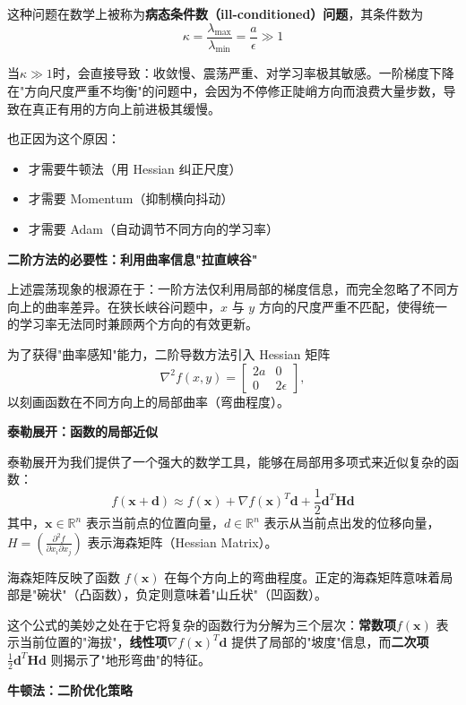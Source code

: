 这种问题在数学上被称为\textbf{病态条件数（ill-conditioned）问题}，其条件数为
$$\kappa = \frac{\lambda_{\max}}{\lambda_{\min}} = \frac{a}{\epsilon} \gg 1$$

当$\kappa \gg 1$时，会直接导致：收敛慢、震荡严重、对学习率极其敏感。一阶梯度下降在"方向尺度严重不均衡"的问题中，会因为不停修正陡峭方向而浪费大量步数，导致在真正有用的方向上前进极其缓慢。

也正因为这个原因：
\begin{itemize}
    \item 才需要牛顿法（用 Hessian 纠正尺度）
    \item 才需要 Momentum（抑制横向抖动）
    \item 才需要 Adam（自动调节不同方向的学习率）
\end{itemize}

\textbf{二阶方法的必要性：利用曲率信息"拉直峡谷"}

上述震荡现象的根源在于：一阶方法仅利用局部的梯度信息，而完全忽略了不同方向上的曲率差异。在狭长峡谷问题中，$x$ 与 $y$ 方向的尺度严重不匹配，使得统一的学习率无法同时兼顾两个方向的有效更新。

为了获得"曲率感知"能力，二阶导数方法引入 Hessian 矩阵
\[
\nabla^2 f(x,y) =
\begin{bmatrix}
2a & 0 \\
0 & 2\epsilon
\end{bmatrix},
\]
以刻画函数在不同方向上的局部曲率（弯曲程度）。

\textbf{泰勒展开：函数的局部近似}

泰勒展开为我们提供了一个强大的数学工具，能够在局部用多项式来近似复杂的函数：
$$
f(\mathbf{x}+\mathbf{d}) \approx f(\mathbf{x}) + \nabla f(\mathbf{x})^T\mathbf{d}
+ \frac{1}{2}\mathbf{d}^T\mathbf{H}\mathbf{d}
$$
其中，$\mathbf{x}\in \mathbb{R}^n$ 表示当前点的位置向量，$d\in \mathbb{R}^n$ 表示从当前点出发的位移向量，$H = \left(\frac{\partial^2 f}{\partial x_i \partial x_j} \right)$ 表示海森矩阵（Hessian Matrix）。

海森矩阵反映了函数 $f(\mathbf{x})$ 在每个方向上的弯曲程度。正定的海森矩阵意味着局部是"碗状"（凸函数），负定则意味着"山丘状"（凹函数）。

这个公式的美妙之处在于它将复杂的函数行为分解为三个层次：\textbf{常数项}$f(\mathbf{x})$ 表示当前位置的"海拔"，\textbf{线性项}$\nabla f(\mathbf{x})^T\mathbf{d}$ 提供了局部的"坡度"信息，而\textbf{二次项}$\frac{1}{2}\mathbf{d}^T\mathbf{H}\mathbf{d}$ 则揭示了"地形弯曲"的特征。

\textbf{牛顿法：二阶优化策略}

